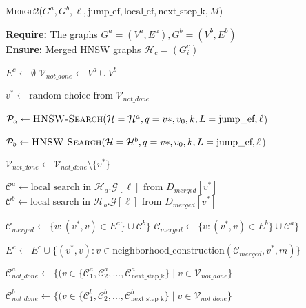 \documentclass{article}
\begin{document}
\begin{algorithm}
\caption{\textsc{Merge2}($G^a, G^b, \ell, \text{jump\_ef}, \text{local\_ef}, \text{next\_step\_k}, M$)}\label{alg:merge2}
\textbf{Require:} The graphs $G^a=(V^a,E^a), G^b=(V^b,E^b)$ \\
\textbf{Ensure:}  Merged HNSW graphs $\mathcal{H}_c = (G^c_i)$ 
\begin{algorithmic}[1]

\State $E^c \gets \emptyset$
\State $\mathcal{V}_{not\_done} \gets V^a \cup V^b$

    \State $v^* \gets \text{random choice from } \mathcal{V}_{not\_done}$
    

    \State $\mathcal{P}_a  \gets \textsc{HNSW-Search}(\mathcal{H}=\mathcal{H}^a, q=v*, v_0, k, L=\text{jump\_ef}, \ell $)

    \State $\mathcal{P}_b \gets \textsc{HNSW-Search}(\mathcal{H}=\mathcal{H}^b, q=v*, v_0, k, L=\text{jump\_ef}, \ell $)
    
    
        \State $\mathcal{V}_{not\_done} \gets \mathcal{V}_{not\_done} \setminus \{v^*\}$
        
        \State $\mathcal{C}^a \gets \text{local search in } \mathcal{H}_a.\mathcal{G}[\ell] \text{ from } D_{merged}[v^*]$
        \State $\mathcal{C}^b \gets \text{local search in } \mathcal{H}_b.\mathcal{G}[\ell] \text{ from } D_{merged}[v^*]$
        
            \State $\mathcal{C}_{merged} \gets  \{v : (v^*, v) \in E^a \} \cup  \mathcal{C}^b\}$
        \Else
            \State $\mathcal{C}_{merged} \gets  \{v : (v^*, v) \in E^b \} \cup  \mathcal{C}^a\}$
        \EndIf
        

        \State $E^c \gets E^c \cup \{ (v^*, v) : v \in \text{neighborhood\_construction}(\mathcal{C}_{merged}, v^*, m) \}$
        
        \State $\mathcal{C}^a_{not\_done} \gets \{(v \in \{\mathcal{C}^a_1, \mathcal{C}^a_2, ..., \mathcal{C}^a_{ \text{next\_step\_k} } \} \mid v \in \mathcal{V}_{not\_done} \}$

        \State $\mathcal{C}^b_{not\_done} \gets \{(v \in \{\mathcal{C}^b_1, \mathcal{C}^b_2, ..., \mathcal{C}^b_{ \text{next\_step\_k} } \} \mid v \in \mathcal{V}_{not\_done} \}$
        

\end{algorithmic}
\end{algorithm}
\end{document}
